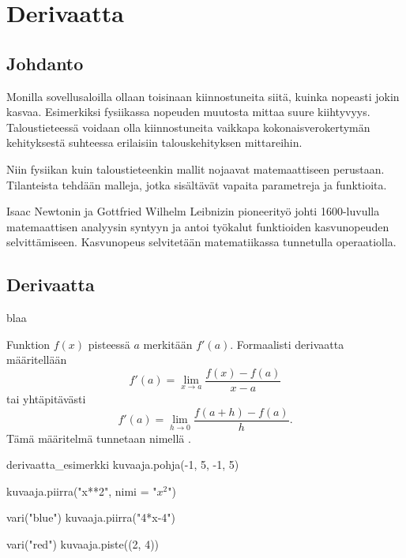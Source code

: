 \chapter{Derivaatta}

\section{Johdanto}


Monilla sovellusaloilla ollaan toisinaan kiinnostuneita siitä, kuinka nopeasti jokin kasvaa.
Esimerkiksi fysiikassa nopeuden muutosta mittaa suure kiihtyvyys. Taloustieteessä voidaan olla
kiinnostuneita vaikkapa kokonaisverokertymän kehityksestä suhteessa erilaisiin talouskehityksen mittareihin.

Niin fysiikan kuin taloustieteenkin mallit nojaavat matemaattiseen perustaan.
Tilanteista tehdään malleja, jotka sisältävät vapaita parametreja ja funktioita.

Isaac Newtonin ja Gottfried Wilhelm Leibnizin pioneerityö johti 1600-luvulla
matemaattisen analyysin syntyyn ja antoi työkalut funktioiden kasvunopeuden selvittämiseen.
Kasvunopeus selvitetään matematiikassa  tunnetulla operaatiolla.

\section{Derivaatta}

blaa

Funktion $f(x)$  pisteessä $a$ merkitään $f'(a)$.
Formaalisti derivaatta määritellään
\[ f'(a) = \lim\limits_{x \to a} \frac{f(x)-f(a)}{x-a} \]
tai yhtäpitävästi
\[ f'(a) = \lim\limits_{h \to 0} \frac{f(a+h)-f(a)}{h}. \]
Tämä määritelmä tunnetaan nimellä .

\begin{luoKuva}{derivaatta_esimerkki}
    kuvaaja.pohja(-1, 5, -1, 5)
    
    kuvaaja.piirra("x**2", nimi = "$x^2$")
    
    vari("blue")
    kuvaaja.piirra("4*x-4")
   
    vari("red")
    kuvaaja.piste((2, 4))
\end{luoKuva}

